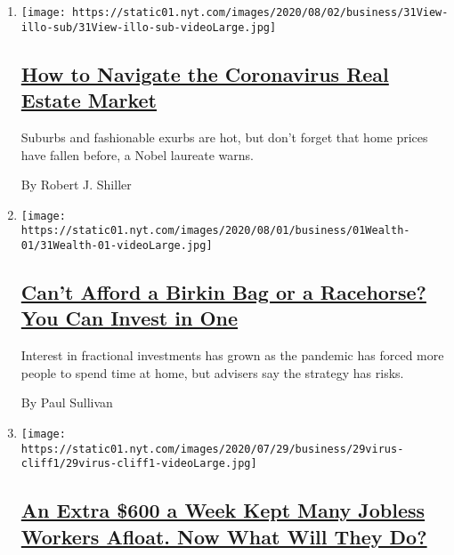 \begin{enumerate}
\def\labelenumi{\arabic{enumi}.}
\item
  \texttt{[image: https://static01.nyt.com/images/2020/08/02/business/31View-illo-sub/31View-illo-sub-videoLarge.jpg]}

  \hypertarget{how-to-navigate-the-coronavirus-real-estate-market}{%
  \subsection{\texorpdfstring{\href{/2020/07/31/business/housing-market-prices-risk.html}{How
  to Navigate the Coronavirus Real Estate
  Market}}{How to Navigate the Coronavirus Real Estate Market}}\label{how-to-navigate-the-coronavirus-real-estate-market}}

  Suburbs and fashionable exurbs are hot, but don't forget that home
  prices have fallen before, a Nobel laureate warns.

  By Robert J. Shiller
\item
  \texttt{[image: https://static01.nyt.com/images/2020/08/01/business/01Wealth-01/31Wealth-01-videoLarge.jpg]}

  \hypertarget{cant-afford-a-birkin-bag-or-a-racehorse-you-can-invest-in-one}{%
  \subsection{\texorpdfstring{\href{/2020/07/31/your-money/birkin-bag-racehorse-invest.html}{Can't
  Afford a Birkin Bag or a Racehorse? You Can Invest in
  One}}{Can't Afford a Birkin Bag or a Racehorse? You Can Invest in One}}\label{cant-afford-a-birkin-bag-or-a-racehorse-you-can-invest-in-one}}

  Interest in fractional investments has grown as the pandemic has
  forced more people to spend time at home, but advisers say the
  strategy has risks.

  By Paul Sullivan
\item
  \texttt{[image: https://static01.nyt.com/images/2020/07/29/business/29virus-cliff1/29virus-cliff1-videoLarge.jpg]}

  \hypertarget{an-extra-600-a-week-kept-many-jobless-workers-afloat-now-what-will-they-do}{%
  \subsection{\texorpdfstring{\href{/2020/07/29/business/economy/unemployment-benefits-coronavirus.html}{An
  Extra \$600 a Week Kept Many Jobless Workers Afloat. Now What Will
  They
  Do?}}{An Extra \$600 a Week Kept Many Jobless Workers Afloat. Now What Will They Do?}}\label{an-extra-600-a-week-kept-many-jobless-workers-afloat-now-what-will-they-do}}


\end{enumerate}
